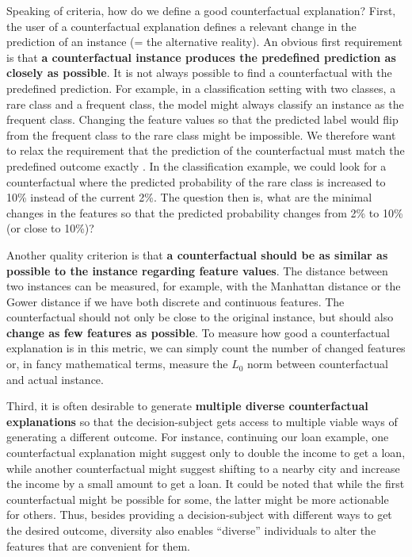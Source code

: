 \documentclass[
  11pt,
]{scrbook}
\begin{document}
Speaking of criteria, how do we define a good counterfactual explanation?
First, the user of a counterfactual explanation defines a relevant change in the prediction of an instance (= the alternative reality).
An obvious first requirement is that \textbf{a counterfactual instance produces the predefined prediction as closely as possible}.
It is not always possible to find a counterfactual with the predefined prediction.
For example, in a classification setting with two classes, a rare class and a frequent class, the model might always classify an instance as the frequent class.
Changing the feature values so that the predicted label would flip from the frequent class to the rare class might be impossible.
We therefore want to relax the requirement that the prediction of the counterfactual must match the predefined outcome exactly .
In the classification example, we could look for a counterfactual where the predicted probability of the rare class is increased to 10\% instead of the current 2\%.
The question then is, what are the minimal changes in the features so that the predicted probability changes from 2\% to 10\% (or close to 10\%)?

Another quality criterion is that \textbf{a counterfactual should be as similar as possible to the instance regarding feature values}.
The distance between two instances can be measured, for example, with the Manhattan distance or the Gower distance if we have both discrete and continuous features.
The counterfactual should not only be close to the original instance, but should also \textbf{change as few features as possible}.
To measure how good a counterfactual explanation is in this metric, we can simply count the number of changed features or, in fancy mathematical terms, measure the \(L_0\) norm between counterfactual and actual instance.

Third, it is often desirable to generate \textbf{multiple diverse counterfactual explanations} so that the decision-subject gets access to multiple viable ways of generating a different outcome.
For instance, continuing our loan example, one counterfactual explanation might suggest only to double the income to get a loan, while another counterfactual might suggest shifting to a nearby city and increase the income by a small amount to get a loan.
It could be noted that while the first counterfactual might be possible for some, the latter might be more actionable for others.
Thus, besides providing a decision-subject with different ways to get the desired outcome, diversity also enables ``diverse'' individuals to alter the features that are convenient for them.
\end{document}
